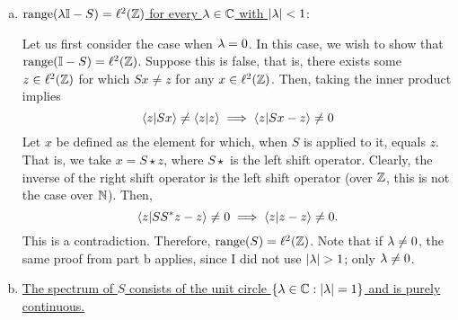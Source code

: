 \begin{solution}
\begin{enumerate}[a)]
        \item \underline{$\text{range} (\mathrm{\lambda}\mathbb{I} - S) = \ell^2(\mathbb{Z})$ for every $\mathrm{\lambda} \in \mathbb{C}$ with $|\mathrm{\lambda}| < 1$}:

        \hop
        Let us first consider the case when $\mathrm{\lambda} = 0$. In this case, we wish to show that $\text{range}(\mathbb{I} - S) = \ell^2(\mathbb{Z})$. Suppose this is false, that is, there exists some $z \in \ell^2(\mathbb{Z})$ for which $Sx \neq z$ for any $x \in \ell^2(\mathbb{Z})$. Then, taking the inner product implies 
        \[\braket{z}{Sx} \neq \braket{z}{z} \implies \braket{z}{Sx - z} \neq 0\]
        Let $x$ be defined as the element for which, when $S$ is applied to it, equals $z$. That is, we take $x = S\star z$, where $S\star$ is the left shift operator. Clearly, the inverse of the right shift operator is the left shift operator (over $\mathbb{Z}$, this is not the case over $\mathbb{N}$). Then, 
        \[\braket{z}{SS^{*} z - z} \neq 0 \implies \braket{z}{z - z} \neq 0.\]
        This is a contradiction. Therefore, $\text{range}(S) = \ell^2(\mathbb{Z})$. Note that if $\mathrm{\lambda} \neq 0$, the same proof from part b applies, since I did not use $|\mathrm{\lambda}| > 1$; only $\mathrm{\lambda} \neq 0$. 

        \item \underline{The spectrum of $S$ consists of the unit circle $\{\mathrm{\lambda}\in\mathbb{C} : |\mathrm{\lambda}| = 1\}$ and is purely continuous.}


\end{enumerate}
\end{solution}
